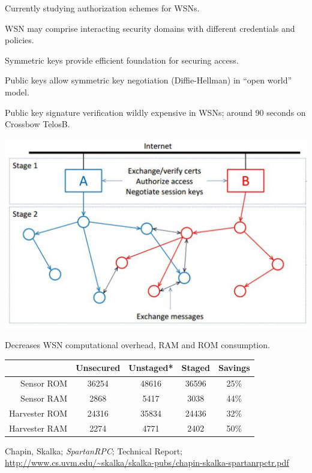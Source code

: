 
Currently studying authorization schemes for WSNs.
\begin{citemize}
\item WSN may comprise interacting security domains with different credentials and policies.
\item Symmetric keys provide efficient foundation for securing access.
\item Public keys allow symmetric key negotiation (Diffie-Hellman) in ``open world'' model.
\end{citemize}
Public key signature verification wildly expensive in WSNs; around 90 seconds on Crossbow
TelosB.

\stopslide


\hspace*{.6in}\includegraphics{spartanrpc}

Decreases WSN computational overhead, RAM and ROM consumption. 
\stopslide


\begin{center}
\begin{tabular}{|r||c|c|c|c|} \hline
              & Unsecured & Unstaged* & Staged & Savings\\ \hline
Sensor ROM    &     36254 &    48616 &  36596 & 25\% \\
Sensor RAM    &      2868 &     5417 &   3038 & 44\% \\ \hline
Harvester ROM &     24316 &    35834 &  24436 & 32\% \\
Harvester RAM &      2274 &     4771 &   2402 & 50\% \\ \hline
\end{tabular}
\end{center}
\vspace{1.5in}
{\small * Chapin, Skalka; \textit{SpartanRPC}; Technical Report;
  \url{http://www.cs.uvm.edu/~skalka/skalka-pubs/chapin-skalka-spartanrpctr.pdf}}
\stopslide

